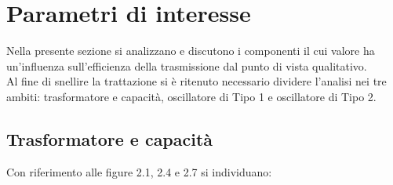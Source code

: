 \documentclass[a4paper, 12pt]{memoir}
\begin{document}
\clearpage
\section{Parametri di interesse}
Nella presente sezione si analizzano e discutono i componenti il cui valore ha
un'influenza sull'efficienza della trasmissione dal punto di vista qualitativo.
\\Al fine di snellire la trattazione si è ritenuto necessario dividere 
l'analisi nei tre ambiti: trasformatore e capacità, oscillatore di Tipo 1 e
oscillatore di Tipo 2.

\subsection{Trasformatore e capacità}
Con riferimento alle figure 2.1, 2.4 e 2.7 si individuano:
\end{document}
